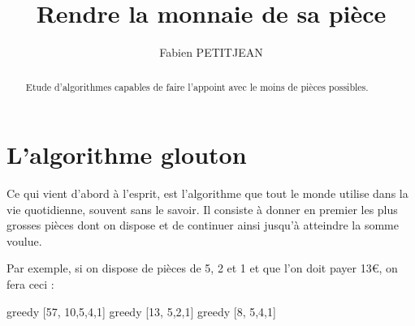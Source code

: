 \documentclass[10pt,a4paper,onecolumn]{article}
\author{Fabien PETITJEAN}
\title{Rendre la monnaie de sa pièce}
\begin{document}
\maketitle

\begin{abstract}
Etude d'algorithmes capables de faire l'appoint avec le moins de pièces possibles.
\end{abstract}

\section{L'algorithme glouton}
Ce qui vient d'abord à l'esprit, est l'algorithme que tout le monde utilise dans la vie quotidienne, souvent sans le savoir. Il consiste à donner en premier les plus grosses pièces dont on dispose et de continuer ainsi jusqu'à atteindre la somme voulue.

Par exemple, si on dispose de pièces de 5, 2 et 1 et que l'on doit payer 13€, on fera ceci :

{{greedy [57, 10,5,4,1]}}
{{greedy [13, 5,2,1]}}
{{greedy [8, 5,4,1]}}
\end{document}
